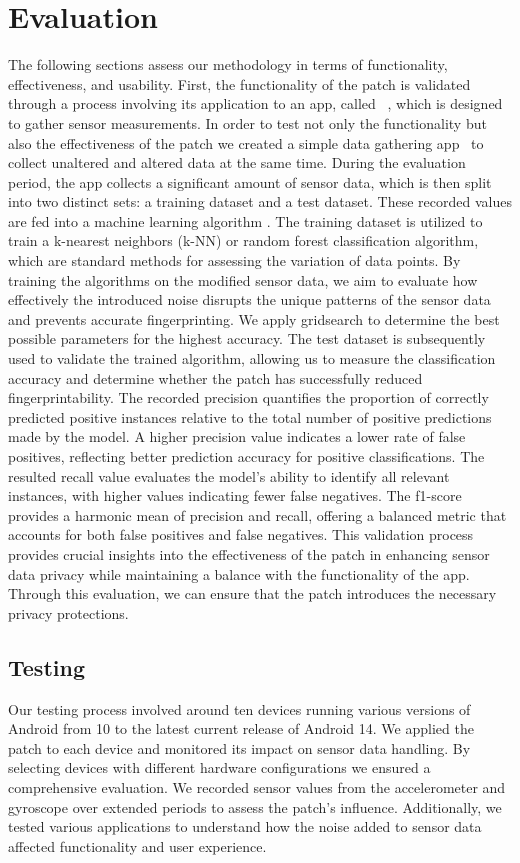 \documentclass[11pt,
  oneside,openany,    %
]{scrreprt}
\begin{document}
\chapter{Evaluation}
\label{chap:evaluation}
The following sections assess our methodology in terms of functionality, effectiveness, and usability. 
First, the functionality of the patch is validated through a process involving its application to an app, called ~\cite{SensorBox}, which is designed to gather sensor measurements.
In order to test not only the functionality but also the effectiveness of the patch we created a simple data gathering app~\cite{sensorprint} to collect unaltered and altered data at the same time. 
During the evaluation period, the app collects a significant amount of sensor data, which is then split into two distinct sets: a training dataset and a test dataset.
These recorded values are fed into a machine learning algorithm \cite{DBLP:journals/tifs/AmeriniBCMN17}.
The training dataset is utilized to train a k-nearest neighbors (k-NN) or random forest classification algorithm, which are standard methods for assessing the variation of data points.
By training the algorithms on the modified sensor data, we aim to evaluate how effectively the introduced noise disrupts the unique patterns of the sensor data and prevents accurate fingerprinting.
We apply gridsearch to determine the best possible parameters for the highest accuracy.
The test dataset is subsequently used to validate the trained algorithm, allowing us to measure the classification accuracy and determine whether the patch has successfully reduced fingerprintability.
The recorded precision quantifies the proportion of correctly predicted positive instances relative to the total number of positive predictions made by the model.
A higher precision value indicates a lower rate of false positives, reflecting better prediction accuracy for positive classifications.
The resulted recall value evaluates the model's ability to identify all relevant instances, with higher values indicating fewer false negatives.
The f1-score provides a harmonic mean of precision and recall, offering a balanced metric that accounts for both false positives and false negatives.
This validation process provides crucial insights into the effectiveness of the patch in enhancing sensor data privacy while maintaining a balance with the functionality of the app.
Through this evaluation, we can ensure that the patch introduces the necessary privacy protections.

\section{Testing}
\label{sec:testing}
Our testing process involved around ten devices running various versions of Android from 10 to the latest current release of Android 14.
We applied the patch to each device and monitored its impact on sensor data handling.
By selecting devices with different hardware configurations we ensured a comprehensive evaluation.
We recorded sensor values from the accelerometer and gyroscope over extended periods to assess the patch's influence.
Additionally, we tested various applications to understand how the noise added to sensor data affected functionality and user experience.
\end{document}
